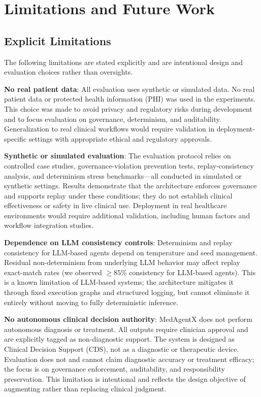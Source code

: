 \documentclass[journal]{IEEEtran}
\begin{document}
\newpage
\section{Limitations and Future Work}
\label{sec:limitations}

\subsection{Explicit Limitations}
The following limitations are stated explicitly and are intentional design and evaluation choices rather than oversights.

\textbf{No real patient data}: All evaluation uses synthetic or simulated data. No real patient data or protected health information (PHI) was used in the experiments. This choice was made to avoid privacy and regulatory risks during development and to focus evaluation on governance, determinism, and auditability. Generalization to real clinical workflows would require validation in deployment-specific settings with appropriate ethical and regulatory approvals.

\textbf{Synthetic or simulated evaluation}: The evaluation protocol relies on controlled case studies, governance-violation prevention tests, replay-consistency analysis, and determinism stress benchmarks—all conducted in simulated or synthetic settings. Results demonstrate that the architecture enforces governance and supports replay under these conditions; they do not establish clinical effectiveness or safety in live clinical use. Deployment in real healthcare environments would require additional validation, including human factors and workflow integration studies.

\textbf{Dependence on LLM consistency controls}: Determinism and replay consistency for LLM-based agents depend on temperature and seed management. Residual non-determinism from underlying LLM behavior may affect replay exact-match rates (we observed $\geq$85\% consistency for LLM-based agents). This is a known limitation of LLM-based systems; the architecture mitigates it through fixed execution graphs and structured logging, but cannot eliminate it entirely without moving to fully deterministic inference.

\textbf{No autonomous clinical decision authority}: MedAgentX does not perform autonomous diagnosis or treatment. All outputs require clinician approval and are explicitly tagged as non-diagnostic support. The system is designed as Clinical Decision Support (CDS), not as a diagnostic or therapeutic device. Evaluation does not and cannot claim diagnostic accuracy or treatment efficacy; the focus is on governance enforcement, auditability, and responsibility preservation. This limitation is intentional and reflects the design objective of augmenting rather than replacing clinical judgment.
\end{document}
